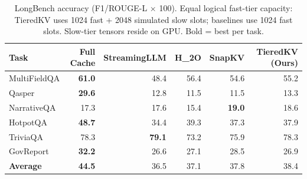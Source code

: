 \begin{table}[t]
\centering
\small
\setlength{\tabcolsep}{5pt}
\caption{LongBench accuracy (F1/ROUGE-L $\times$ 100). Equal logical fast-tier capacity: TieredKV uses 1024 fast + 2048 simulated slow slots; baselines use 1024 fast slots. Slow-tier tensors reside on GPU. Bold = best per task.}
\label{tab:accuracy_equivram}
\begin{tabular}{lrrrrr}
\toprule
\textbf{Task} & \textbf{Full Cache} & \textbf{StreamingLLM} & \textbf{H_2O} & \textbf{SnapKV} & \textbf{TieredKV (Ours)} \\
\midrule
MultiFieldQA & \textbf{61.0} & 48.4 & 56.4 & 54.6 & 55.2 \\
Qasper & \textbf{29.6} & 12.8 & 11.5 & 11.5 & 13.3 \\
NarrativeQA & 17.3 & 17.6 & 15.4 & \textbf{19.0} & 18.6 \\
HotpotQA & \textbf{48.7} & 34.4 & 39.3 & 37.3 & 37.9 \\
TriviaQA & 78.3 & \textbf{79.1} & 73.2 & 75.9 & 78.3 \\
GovReport & \textbf{32.2} & 26.6 & 27.1 & 28.5 & 26.9 \\
\midrule
\textbf{Average} & \textbf{44.5} & 36.5 & 37.1 & 37.8 & 38.4 \\
\bottomrule
\end{tabular}
\end{table}
